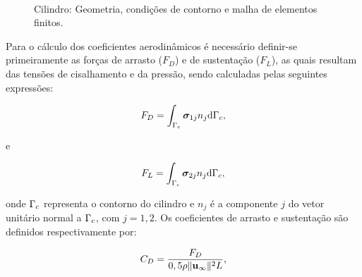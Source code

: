 \begin{figure}[!htbp]
	\caption{Cilindro: Geometria, condições de contorno e malha de elementos finitos.}
	\begin{center}
	\\
	\end{center}
\end{figure}

Para o cálculo dos coeficientes aerodinâmicos é necessário definir-se primeiramente as forças de arrasto ($F_D$) e de sustentação ($F_L$), as quais resultam das tensões de cisalhamento e da pressão, sendo calculadas pelas seguintes expressões:

\begin{align}
F_D = \int_{\Gamma_{c}} \boldsymbol{\sigma}_{1j}n_{j} \mathrm{d}\Gamma_{c}, \label{eq:F_D}
\end{align}

\noindent e 

\begin{align}
F_L = \int_{\Gamma_{c}} \boldsymbol{\sigma}_{2j}n_{j} \mathrm{d}\Gamma_{c},  \label{eq:F_L}
\end{align}

\noindent onde $\Gamma_{c}$ representa o contorno do cilindro e $n_j$ é a componente $j$ do vetor unitário normal a $\Gamma_{c}$, com $j=1,2$. Os coeficientes de arrasto e sustentação são definidos respectivamente por:

\begin{align}
	C_D = \frac{F_D}{0,5\rho \lVert \mathbf{u}_{\infty} \lVert^{2} L},
\end{align}

